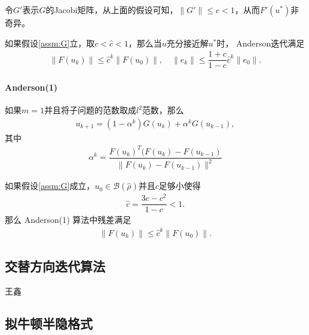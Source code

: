 	令$G' $表示$G $的Jacobi矩阵，从上面的假设可知，$ \|G'\|\leq c<1 $，从而$ F'(u^*) $非奇异。
	
	\begin{theorem}
		如果假设\ref{assm:G}立，取$ c<\hat{c}<1 $，那么当$ u $充分接近解$ u^* $时， Anderson迭代满足
		\begin{align*}
		\|F(u_k)\|\leq \hat{c}^k\|F(u_0)\|,\quad \|e_k\| \leq \dfrac{1+c}{1-c}\hat{c}^k\|e_0\|.
		\end{align*}
	\end{theorem}
	
	
	\paragraph{Anderson(1)} 如果$ m = 1 $并且将子问题的范数取成$ l^2 $范数，那么
	\begin{align*}
	u_{k+1} = (1-\alpha^k)G(u_k) + \alpha^k G(u_{k-1}),
	\end{align*}
	其中
	\begin{align*}
	\alpha^k = \dfrac{F(u_k)^T(F(u_k) - F(u_{k-1})}{\|F(u_k) - F(u_{k-1})\|^2}
	\end{align*}
	
	\begin{theorem}
		如果假设\ref{assm:G}成立，$ u_0\in\mathcal{B}(\hat{\rho}) $并且$ c $足够小使得
		\begin{align*}
		\hat{c} = \dfrac{3c - c^2}{1-c}<1.
		\end{align*}
		那么 Anderson(1) 算法中残差满足
		\begin{align*}
		\|F(u_k)\| \leq \hat{c}^k\|F(u_0)\|.
		\end{align*}
	\end{theorem}
\subsection{交替方向迭代算法}
{\color{red}\begin{center}
    王鑫
\end{center}}

\subsection{拟牛顿半隐格式}
